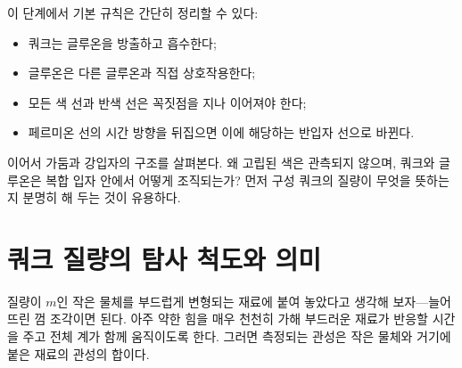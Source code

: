 \begin{classroomqa}
\end{classroomqa}

\begin{classroomqa}
\end{classroomqa}

이 단계에서 기본 규칙은 간단히 정리할 수 있다:

\begin{itemize}
\item 쿼크는 글루온을 방출하고 흡수한다;
\item 글루온은 다른 글루온과 직접 상호작용한다;
\item 모든 색 선과 반색 선은 꼭짓점을 지나 이어져야 한다;
\item 페르미온 선의 시간 방향을 뒤집으면 이에 해당하는 반입자 선으로 바뀐다.
\end{itemize}

\begin{classroomqa}
\end{classroomqa}

이어서 가둠과 강입자의 구조를 살펴본다. 왜 고립된 색은 관측되지 않으며, 쿼크와 글루온은 복합 입자 안에서 어떻게 조직되는가? 먼저 구성 쿼크의 질량이 무엇을 뜻하는지 분명히 해 두는 것이 유용하다.

\section{쿼크 질량의 탐사 척도와 의미}

질량이 \(m\)인 작은 물체를 부드럽게 변형되는 재료에 붙여 놓았다고 생각해 보자---늘어뜨린 껌 조각이면 된다. 아주 약한 힘을 매우 천천히 가해 부드러운 재료가 반응할 시간을 주고 전체 계가 함께 움직이도록 한다. 그러면 측정되는 관성은 작은 물체와 거기에 붙은 재료의 관성의 합이다.


